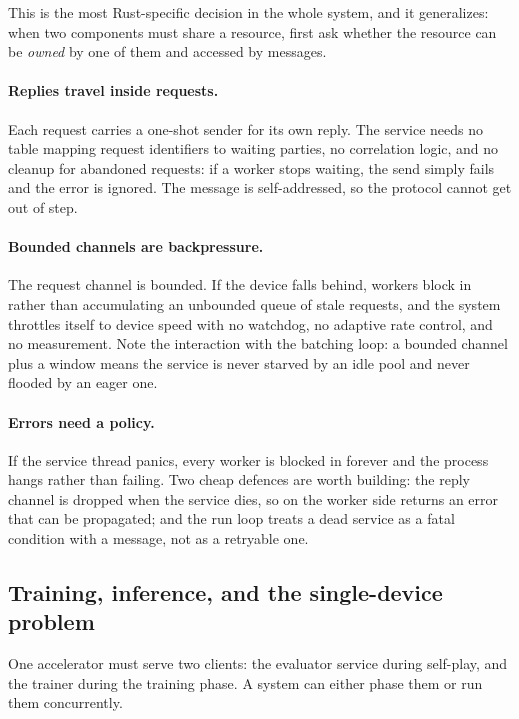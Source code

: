 This is the most Rust-specific decision in the whole system, and it generalizes:
when two components must share a resource, first ask whether the resource can be
\emph{owned} by one of them and accessed by messages.

\paragraph{Replies travel inside requests.} Each request carries a one-shot
sender for its own reply. The service needs no table mapping request identifiers
to waiting parties, no correlation logic, and no cleanup for abandoned requests:
if a worker stops waiting, the send simply fails and the error is ignored. The
message is self-addressed, so the protocol cannot get out of step.

\paragraph{Bounded channels are backpressure.} The request channel is bounded. If
the device falls behind, workers block in  rather than accumulating an
unbounded queue of stale requests, and the system throttles itself to device
speed with no watchdog, no adaptive rate control, and no measurement. Note the
interaction with the batching loop: a bounded channel plus a
 window means the service is never starved by an idle pool
and never flooded by an eager one.

\paragraph{Errors need a policy.} If the service thread panics, every worker is
blocked in  forever and the process hangs rather than failing. Two
cheap defences are worth building: the reply channel is dropped when the service
dies, so  on the worker side returns an error that can be propagated;
and the run loop treats a dead service as a fatal condition with a message, not
as a retryable one.

\subsection{Training, inference, and the single-device problem}
\label{sec:phased}

One accelerator must serve two clients: the evaluator service during self-play,
and the trainer during the training phase. A system can either phase them or run
them concurrently.

